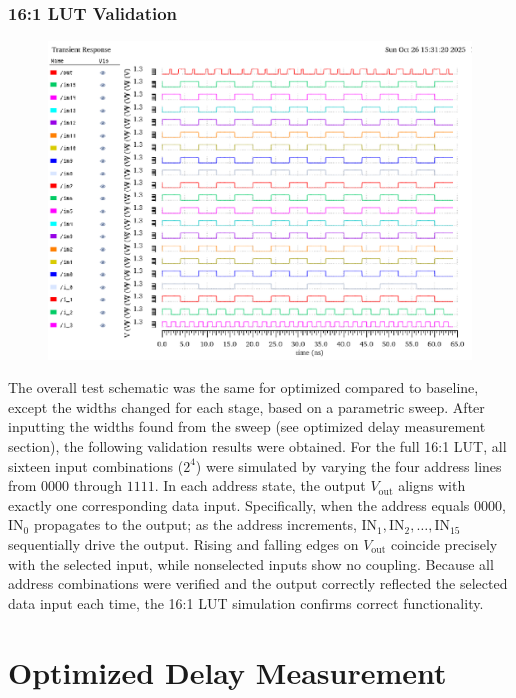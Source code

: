 \documentclass[12pt]{article}
\begin{document}
\subsubsection*{16:1 LUT Validation}
\begin{figure}[H]
    \centering
    \includegraphics[width=\linewidth]{writeup//figures/lut_opt_validation_sim_updated.png}
    \caption{}
\end{figure}
The overall test schematic was the same for optimized compared to baseline, except the widths changed for each stage, based on a parametric sweep. After inputting the widths found from the sweep (see optimized delay measurement section), the following validation results were obtained.  For the full 16:1 LUT, all sixteen input combinations (\(2^4\)) were simulated by varying the four address lines from \(0000\) through \(1111\). 
In each address state, the output \(V_{\text{out}}\) aligns with exactly one corresponding data input. 
Specifically, when the address equals \(0000\), \(\text{IN}_0\) propagates to the output; as the address increments, \(\text{IN}_1, \text{IN}_2, \ldots, \text{IN}_{15}\) sequentially drive the output. 
Rising and falling edges on \(V_{\text{out}}\) coincide precisely with the selected input, while nonselected inputs show no coupling. 
Because all address combinations were verified and the output correctly reflected the selected data input each time, the 16:1 LUT simulation confirms correct functionality.

\newpage
\section{Optimized Delay Measurement}
\end{document}
